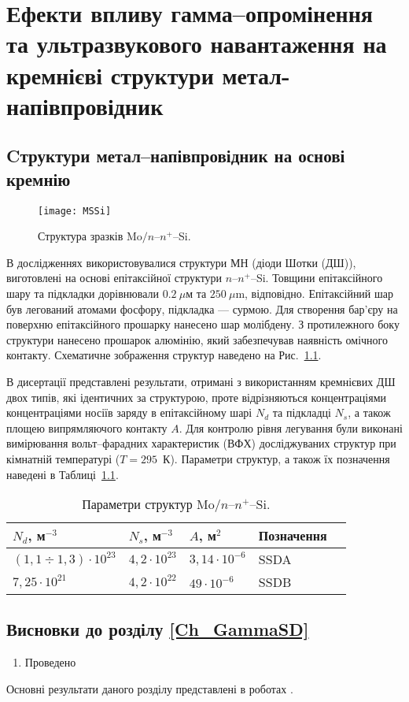 \chapter{Ефекти впливу гамма--опромінення та ультразвукового навантаження на кремнієві структури метал-напівпровідник\label{Ch_GammaSD}}

\section{Cтруктури метал--напівпровідник на основі кремнію\label{MSSi}}

\begin{figure}[b]
\center
\texttt{[image: MSSi]}%
\caption{\label{figMSSi}
Структура зразків Mo$/n$--$n^+$--Si.
}
\end{figure}

В дослідженнях використовувалися структури МН (діоди Шотки (ДШ)), виготовлені на основі епітаксійної
структури $n$--$n^+$--Si.
Товщини епітаксійного шару та підкладки дорівнювали $0.2~\mu$м та $250~\mu$m, відповідно.
Епітаксійний шар був легований атомами фосфору, підкладка --- сурмою.
Для створення бар'єру на поверхню епітаксійного прошарку нанесено шар молібдену.
З протилежного боку структури нанесено прошарок алюмінію, який забезпечував наявність омічного контакту.
Схематичне зображення структур наведено на Рис.~\ref{figMSSi}.


В дисертації представлені результати, отримані з використанням кремнієвих ДШ двох типів,
які ідентичних за структурою, проте відрізняються концентраціями концентраціями носіїв заряду в епітаксійному шарі $N_d$ та
підкладці $N_s$, а також площею випрямляючого контакту $A$.
Для контролю рівня легування були виконані вимірювання вольт--фарадних характеристик (ВФХ) досліджуваних структур при кімнатній температурі ($T = 295$~К).
Параметри структур, а також їх позначення наведені в Таблиці~\ref{tabMSSi}.


\begin{table}
\caption{\label{tabMSSi}Параметри структур Mo$/n$--$n^+$--Si.
}
\begin{tabularx}{\textwidth}{|>{\centering\arraybackslash}X|>{\centering\arraybackslash}X|>{\centering\arraybackslash}X|>{\centering\arraybackslash}X|>{\centering\arraybackslash}X|}
\hline
$N_d$, м$^{-3}$&$N_s$, м$^{-3}$&$A$, м$^2$&Позначення\\
\hline
$(1,1\div1,3)\cdot10^{23}$&$4,2\cdot10^{23}$&$3,14\cdot10^{-6}$&SSDA\\
\hline
$7,25\cdot10^{21}$&$4,2\cdot10^{22}$&$49\cdot10^{-6}$&SSDB\\
\hline
\end{tabularx}
\end{table}



\section*{Висновки до розділу \ref{Ch_GammaSD}}
  \begin{enumerate}
     \item Проведено
  \end{enumerate}	
  
Основні результати даного розділу представлені в роботах \cite{Olikh:Rev,6CPFCS}.
